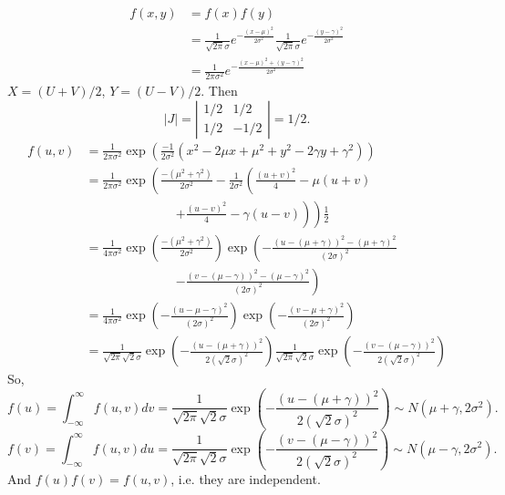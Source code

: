 \documentclass[14pt]{elegantbook}
\begin{document}
    \begin{solution}
        \begin{align*}
            f(x, y)&=f(x)f(y)\\
            &=\frac{1}{\sqrt{2\pi}\sigma}e^{-\frac{(x-\mu)^2}{2\sigma^2}}\frac{1}{\sqrt{2\pi}\sigma}e^{-\frac{(y-\gamma)^2}{2\sigma^2}}\\
            &=\frac{1}{2\pi\sigma^2}e^{-\frac{(x-\mu)^2+(y-\gamma)^2}{2\sigma^2}}
        \end{align*}
        $X=(U+V)/2$, $Y=(U-V)/2$. Then
        \[|J|=\left|\begin{matrix}
            1/2&1/2\\
            1/2&-1/2
        \end{matrix}\right|=1/2. \]
        \begin{align*}
            f(u, v)&=\frac{1}{2\pi\sigma^2}\exp\left(\frac{-1}{2\sigma^2}\left(x^2-2\mu x+\mu^2+y^2-2\gamma y+\gamma^2\right)\right)\\
            &=\frac{1}{2\pi\sigma^2}\exp\left(\frac{-(\mu^2+\gamma^2)}{2\sigma^2}-\frac{1}{2\sigma^2}\left(\frac{(u+v)^2}{4}-\mu(u+v)\right.\right.\\
            &\hspace{85pt}\left.\left.+\frac{(u-v)^2}{4}-\gamma(u-v)\right)\right)\frac{1}{2}\\
            &=\frac{1}{4\pi\sigma^2}\exp\left(\frac{-(\mu^2+\gamma^2)}{2\sigma^2}\right)\exp\left(-\frac{(u-(\mu+\gamma))^2-(\mu+\gamma)^2}{(2\sigma)^2}\right.\\
            &\hspace{85pt}\left.-\frac{(v-(\mu-\gamma))^2-(\mu-\gamma)^2}{(2\sigma)^2}\right)\\
            &=\frac{1}{4\pi\sigma^2}\exp\left(-\frac{(u-\mu-\gamma)^2}{(2\sigma)^2}\right)\exp\left(-\frac{(v-\mu+\gamma)^2}{(2\sigma)^2}\right)\\
            &=\frac{1}{\sqrt{2\pi}\sqrt{2}\sigma}\exp\left(-\frac{(u-(\mu+\gamma))^2}{2(\sqrt{2}\sigma)^2}\right)\frac{1}{\sqrt{2\pi}\sqrt{2}\sigma}\exp\left(-\frac{(v-(\mu-\gamma))^2}{2(\sqrt{2}\sigma)^2}\right)
        \end{align*}
        So, \[f(u)=\int_{-\infty}^\infty f(u, v)dv=\frac{1}{\sqrt{2\pi}\sqrt{2}\sigma}\exp\left(-\frac{(u-(\mu+\gamma))^2}{2(\sqrt{2}\sigma)^2}\right)\sim N(\mu+\gamma, 2\sigma^2). \]
        \[f(v)=\int_{-\infty}^\infty f(u, v)du=\frac{1}{\sqrt{2\pi}\sqrt{2}\sigma}\exp\left(-\frac{(v-(\mu-\gamma))^2}{2(\sqrt{2}\sigma)^2}\right)\sim N(\mu-\gamma, 2\sigma^2). \]
        And $f(u)f(v)=f(u,v)$, i.e. they are independent. 
    \end{solution}
\end{document}
